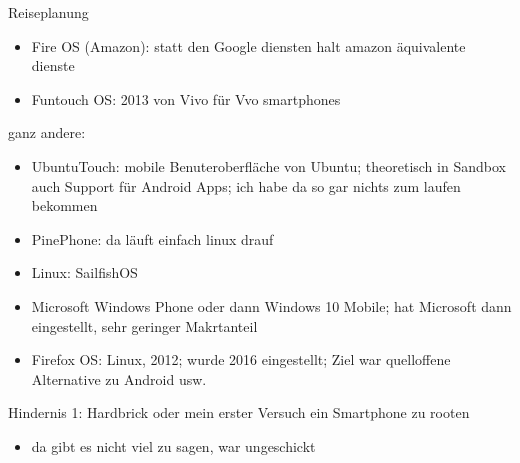 \documentclass[14pt,compress,usenames,dvipsnames,aspectratio=169]{beamer}
\begin{document}
\begin{frame}{Reiseplanung}
{\begin{itemize}
            \item Fire OS (Amazon): statt den Google diensten halt amazon äquivalente dienste
            \item Funtouch OS: 2013 von Vivo für Vvo smartphones
        \end{itemize} 
        ganz andere:
        \begin{itemize}
            \item UbuntuTouch: mobile Benuteroberfläche von Ubuntu; theoretisch in Sandbox auch Support für Android Apps; ich habe da so gar nichts zum laufen bekommen
            \item PinePhone: da läuft einfach linux drauf
            \item Linux: SailfishOS
            \item Microsoft Windows Phone oder dann Windows 10 Mobile; hat Microsoft dann eingestellt, sehr geringer Makrtanteil
            \item Firefox OS: Linux, 2012; wurde 2016 eingestellt; Ziel war quelloffene Alternative zu Android usw.
        \end{itemize}        
    }

\end{frame}

\begin{frame}{Hindernis 1: Hardbrick}
    oder mein erster Versuch ein Smartphone zu rooten
    \begin{itemize}
        \item da gibt es nicht viel zu sagen, war ungeschickt
    \end{itemize}

\end{frame}
\end{document}
